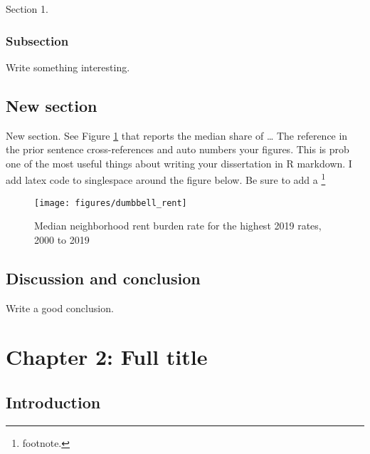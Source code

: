 \documentclass[
]{DissertateCUNY}
\begin{document}
Section 1.

\hypertarget{subsection}{%
\subsection{Subsection}\label{subsection}}

Write something interesting.

\hypertarget{new-section}{%
\section{New section}\label{new-section}}

New section. See Figure \ref{fig:dumbbellrent} that reports the median
share of \ldots{} The reference in the prior sentence cross-references
and auto numbers your figures. This is prob one of the most useful
things about writing your dissertation in R markdown. I add latex code
to singlespace around the figure below. Be sure to add a \footnote{footnote.}

\begin{singlespace}
\begin{figure}

{\centering \texttt{[image: figures/dumbbell\_rent]} 

}

\caption{Median neighborhood rent burden rate for the highest 2019 rates, 2000 to 2019}\label{fig:dumbbellrent}
\end{figure}
\end{singlespace}

\hypertarget{discussion-and-conclusion}{%
\section{Discussion and conclusion}\label{discussion-and-conclusion}}

Write a good conclusion.

\FloatBarrier

\newpage
{}
\fancyhead[R]{\thepage}
\fancyfoot[C]{}

\chapter{Chapter 2: Full title}

\doublespacing

\hypertarget{introduction-1}{%
\section{Introduction}\label{introduction-1}}
\end{document}
